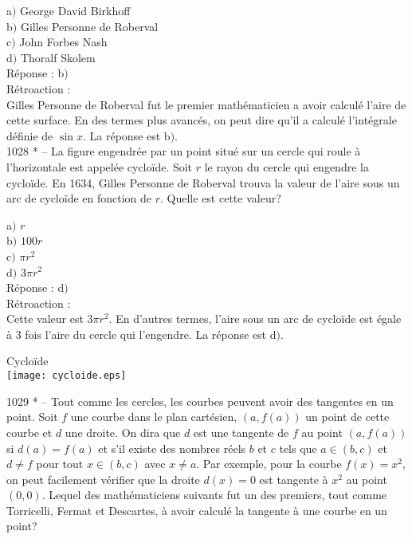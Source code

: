 ﻿\documentclass[letterpaper, 12pt]{article}
\begin{document}
a$)$ George David Birkhoff  \\
b$)$ Gilles Personne de Roberval \\
c$)$ John Forbes Nash  \\
d$)$ Thoralf Skolem\\

R\'eponse : b$)$\\

R\'etroaction :\\
Gilles Personne de Roberval fut le premier math\'ematicien a avoir
calcul\'e l'aire de cette surface. En des termes plus avanc\'es, on
peut dire qu'il a calcul\'e l'int\'egrale d\'efinie de $\sin x$.
La r\'eponse est b$)$.\\

1028 * -- La figure engendr\'ee par un point situ\'e sur un cercle
qui roule \`a l'horizontale est appel\'ee cyclo\"ide. Soit $r$ le
rayon du cercle qui engendre la cyclo\"ide. En 1634, Gilles Personne
de Roberval trouva la valeur de l'aire sous un arc de cyclo\"ide en
fonction de $r$. Quelle est cette valeur?

a$)$ $r$  \\
b$)$ $100r$ \\
c$)$ $\pi r^2$  \\
d$)$ $3\pi r^2$ \\

R\'eponse : d$)$\\

R\'etroaction :\\
Cette valeur est $3\pi r^2$. En d'autres termes, l'aire sous un arc
de cyclo\"ide est \'egale \`a 3 fois l'aire du cercle qui
l'engendre.
La r\'eponse est d$)$.\\

        \begin{center}
Cyclo\"ide        \\
    \texttt{[image: cycloide.eps]}\\
    \end{center}

1029 * -- Tout comme les cercles, les courbes peuvent avoir des
tangentes en un point. Soit $f$ une courbe dans le plan cart\'esien,
$(a,f(a))$ un point de cette courbe et $d$ une droite. On dira que
$d$ est une tangente de $f$ au point $(a,f(a))$ si $d(a)=f(a)$ et
s'il existe des nombres r\'eels $b$ et $c$ tels que $a\in(b,c)$ et
$d\not=f$ pour tout $x\in(b,c)$ avec $x\not=a$. Par exemple, pour la
courbe $f(x)=x^2$, on peut facilement v\'erifier que la droite
$d(x)=0$ est tangente \`a $x^2$ au point $(0,0)$. Lequel des
math\'ematiciens suivants fut un des premiers, tout comme
Torricelli, Fermat et Descartes, \`a avoir calcul\'e la tangente \`a
une courbe en un point?
\end{document}
